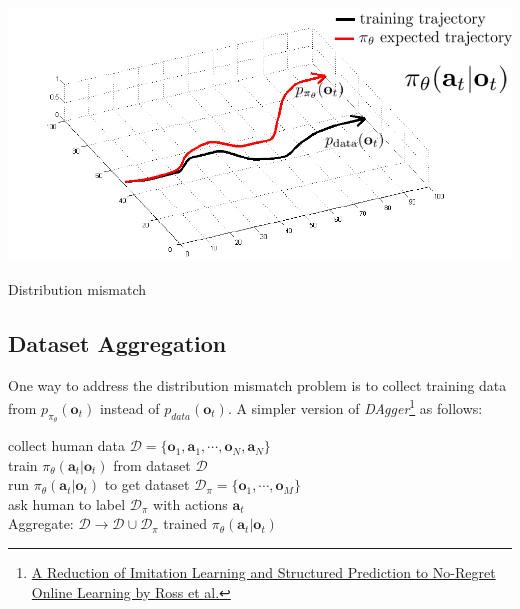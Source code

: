 \documentclass[nobib]{tufte-handout}
\begin{document}
\begin{marginfigure}
  \centering
  \includegraphics[width=\linewidth]{mismatch}
  \caption{Distribution mismatch}
  \label{fig:mismatch}
\end{marginfigure}

\subsection{Dataset Aggregation}
One way to address the distribution mismatch problem is to collect training data from $p_{\pi_\theta}(\mathbf{o}_t)$ instead of $p_{data}(\mathbf{o}_t)$. A simpler version of \emph{DAgger}\thanks{\href{https://arxiv.org/abs/1011.0686}{A Reduction of Imitation Learning and Structured Prediction to No-Regret Online Learning by Ross et al.}} as follows:


\begin{algorithm}
    \label{algo:DAgger}
    \begin{algorithmic}[1]
    \ENSURE collect human data $\mathcal{D} = \{\mathbf{o}_1, \mathbf{a}_1, \cdots, \mathbf{o}_N, \mathbf{a}_N \}$\\           %
    \STATE train $\pi_\theta(\mathbf{a}_t | \mathbf{o}_t)$ from dataset $\mathcal{D}$ \\  %
    \STATE run $\pi_\theta(\mathbf{a}_t | \mathbf{o}_t)$ to get dataset $\mathcal{D}_\pi = \{\mathbf{o}_1,  \cdots, \mathbf{o}_M \}$ \\
    \STATE ask human to label $\mathcal{D}_\pi$ with actions $\mathbf{a}_t$ \\
    \STATE Aggregate: $\mathcal{D} \rightarrow \mathcal{D} \cup \mathcal{D}_\pi$
    \ENDWHILE
    \RETURN trained $\pi_\theta(\mathbf{a}_t | \mathbf{o}_t)$  %
  \end{algorithmic}
\end{algorithm}
\end{document}
